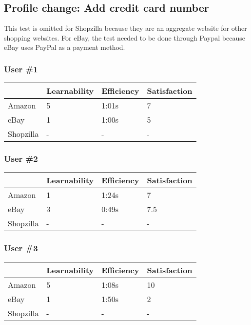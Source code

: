 \documentclass[11pt, oneside]{article}   	%
\begin{document}
\subsection{Profile change: Add credit card number}
    
This test is omitted for Shopzilla because they are an aggregate website for other shopping websites. For eBay, the test needed to be done through Paypal because eBay uses PayPal as a payment method.

\subsubsection{User \#1}

\begin{tabular}{| l | l | l | l |}
    \hline
     & Learnability & Efficiency & Satisfaction \\ \hline
    Amazon & 5 & 1:01s & 7 \\ \hline
    eBay & 1 & 1:00s & 5 \\ \hline
    Shopzilla & - & - & - \\\hline
\end{tabular}

\subsubsection{User \#2}

\begin{tabular}{| l | l | l | l |}
    \hline
     & Learnability & Efficiency & Satisfaction \\ \hline
    Amazon & 1 & 1:24s & 7 \\ \hline
    eBay & 3 & 0:49s & 7.5 \\ \hline
    Shopzilla & - & - & - \\\hline
\end{tabular}

\subsubsection{User \#3}

\begin{tabular}{| l | l | l | l |}
    \hline
     & Learnability & Efficiency & Satisfaction \\ \hline
    Amazon & 5 & 1:08s & 10 \\ \hline
    eBay & 1 & 1:50s & 2 \\ \hline
    Shopzilla & - & - & - \\\hline
\end{tabular}
\end{document}
